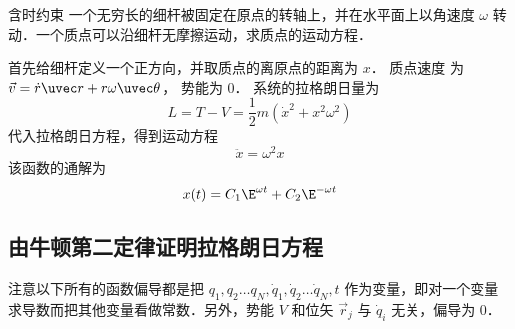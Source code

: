 \begin{exam}{含时约束}
一个无穷长的细杆被固定在原点的转轴上，并在水平面上以角速度 $\omega$ 转动．一个质点可以沿细杆无摩擦运动，求质点的运动方程．

首先给细杆定义一个正方向，并取质点的离原点的距离为 $x$． 质点速度%
为 $\vec v = \dot r \uvec r + r\omega \uvec\theta$， 势能为 0． 系统的拉格朗日量为
\begin{equation}
L = T - V = \frac{1}{2}m({\dot x^2} + {x^2}{\omega^2})
\end{equation}
代入拉格朗日方程，得到运动方程
\begin{equation}
\ddot x = {\omega ^2} x
\end{equation}
该函数的通解为%
\begin{equation}
x(t) = {C_1}{\E^{\omega t}} + {C_2}{\E^{ - \omega t}}
\end{equation}
\end{exam}


\subsection{由牛顿第二定律证明拉格朗日方程}
注意以下所有的函数偏导都是把 ${q_1},{q_2}\dots{q_N},{{\dot q}_1},{{\dot q}_2}\dots{{\dot q}_N},t$ 作为变量，即对一个变量求导数而把其他变量看做常数．另外，势能 $V$ 和位矢 $\vec r_j$ 与 $\dot q_i$ 无关，偏导为 0．

